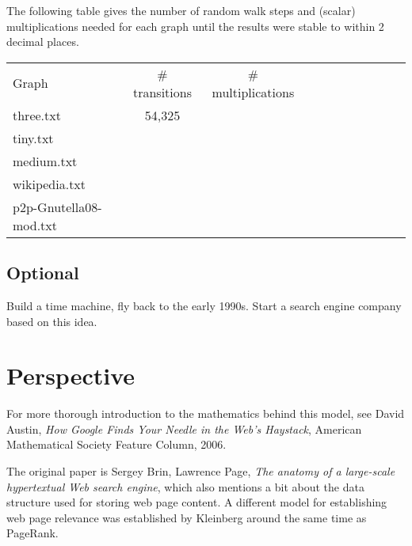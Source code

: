 \documentclass{tufte-handout}
\begin{document}
\bigskip The following table gives the number of random walk steps and
(scalar) multiplications needed for each graph until the results were
stable to within 2 decimal places.

\medskip
\begin{fullwidth}
\small
\begin{tabular}{lcccccccccc}
Graph & \# transitions  & \# multiplications \\
three.txt & 54,325 \\
tiny.txt &\\
medium.txt &\\
wikipedia.txt & \\
p2p-Gnutella08-mod.txt
\end{tabular}
\end{fullwidth}

\subsection{Optional}

Build a time machine, fly back to the early 1990s.
Start a search engine company based on this idea.


\section{Perspective}

For more thorough introduction to the mathematics
  behind this model, see David Austin, \emph{How Google Finds Your Needle in
  the Web's Haystack}, American Mathematical Society Feature Column,
  2006.

The original paper is Sergey Brin, Lawrence Page, \emph{The anatomy of a
large-scale hypertextual Web search engine}, which also mentions a
bit about the data structure used for storing web page content.
A different model for establishing web page relevance was established
by Kleinberg around the same time as PageRank.
\end{document}

